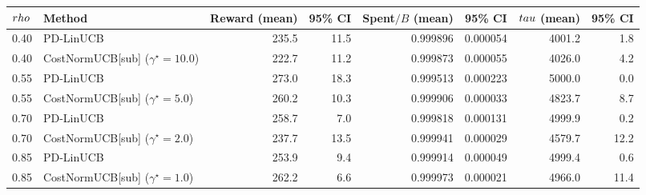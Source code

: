 \begin{tabular}{l l r r r r r r}
\toprule
$\\rho$ & Method & Reward (mean) & 95\% CI & Spent$/B$ (mean) & 95\% CI & $\\tau$ (mean) & 95\% CI \\
\midrule
0.40 & PD-LinUCB & 235.5 & 11.5 & 0.999896 & 0.000054 & 4001.2 & 1.8 \\
0.40 & CostNormUCB[sub] ($\gamma^\star=10.0$) & 222.7 & 11.2 & 0.999873 & 0.000055 & 4026.0 & 4.2 \\
0.55 & PD-LinUCB & 273.0 & 18.3 & 0.999513 & 0.000223 & 5000.0 & 0.0 \\
0.55 & CostNormUCB[sub] ($\gamma^\star=5.0$) & 260.2 & 10.3 & 0.999906 & 0.000033 & 4823.7 & 8.7 \\
0.70 & PD-LinUCB & 258.7 & 7.0 & 0.999818 & 0.000131 & 4999.9 & 0.2 \\
0.70 & CostNormUCB[sub] ($\gamma^\star=2.0$) & 237.7 & 13.5 & 0.999941 & 0.000029 & 4579.7 & 12.2 \\
0.85 & PD-LinUCB & 253.9 & 9.4 & 0.999914 & 0.000049 & 4999.4 & 0.6 \\
0.85 & CostNormUCB[sub] ($\gamma^\star=1.0$) & 262.2 & 6.6 & 0.999973 & 0.000021 & 4966.0 & 11.4 \\
\bottomrule
\end{tabular}
